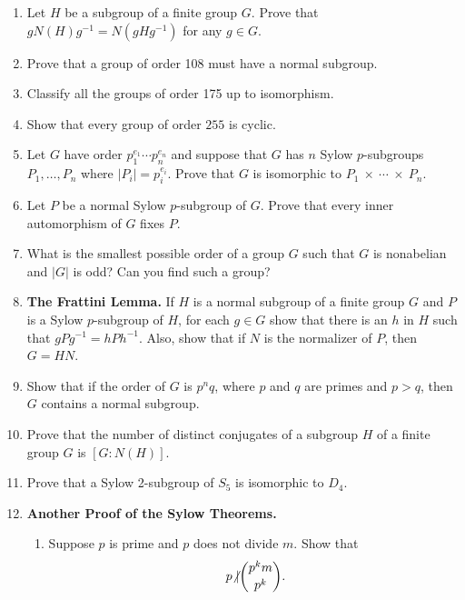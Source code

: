 {\begin{enumerate}
\item
Let $H$ be a subgroup of a finite group $G$. Prove that $g N(H) g^{-1}
= N(gHg^{-1})$ for any $g \in G$. 

\item
Prove that a group of order 108 must have a normal subgroup.

\item
Classify all the groups of order 175 up to isomorphism.

\item
Show that every group of order $255$ is cyclic.

\item
Let $G$ have order $p_1^{e_1} \cdots p_n^{e_n}$ and suppose that $G$
has $n$ Sylow \mbox{$p$-subgroups} $P_1, \ldots, P_n$ where 
$|P_i| = p_i^{e_i}$.  Prove that $G$ is isomorphic to 
$P_1~\times~\cdots~\times~P_n$. 
 
\item
Let $P$ be a normal Sylow $p$-subgroup of $G$.  Prove that every inner
automorphism of $G$ fixes $P$.  
 
 
\item
What is the smallest possible order of a group $G$ such that $G$ is
nonabelian and $|G|$ is odd?  Can you find such a group?
 
 
\item
\textbf{The Frattini Lemma.}  
If $H$ is a normal subgroup of a finite group $G$ and $P$ is a Sylow
$p$-subgroup of $H$, for each $g \in G$ show that there is an $h$ in
$H$ such that $gPg^{-1} = hPh^{-1}$.  Also, show that if $N$ is the
normalizer of $P$, then $G= HN$. 
 
 
\item
Show that if the order of $G$ is $p^nq$, where $p$ and $q$ are primes
and $p > q$, then $G$ contains a normal subgroup. 
 
 
\item
Prove that the number of distinct conjugates of a subgroup $H$ of a 
finite group $G$ is $[G : N(H) ]$. 
 
 
\item
Prove that a Sylow 2-subgroup of $S_5$ is isomorphic to $D_4$.
 
 
\item
\textbf{Another Proof of the Sylow Theorems.}
\begin{enumerate}
 
\item
Suppose $p$ is prime and $p$ does not divide $m$.  Show that
\[
p {\not{\mid}}
\binom{p^k m}{p^k}.
\]
 

\end{enumerate}
\end{enumerate}}
